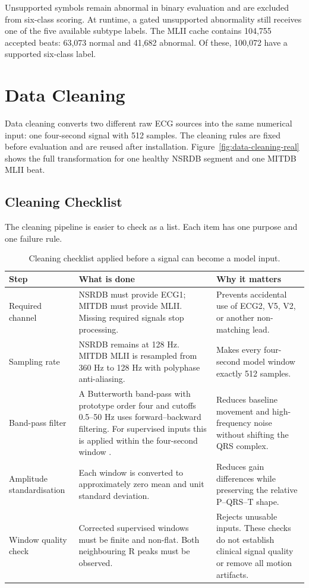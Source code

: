 Unsupported symbols remain abnormal in binary evaluation and are excluded
from six-class scoring. At runtime, a gated unsupported abnormality still
receives one of the five available subtype labels. The MLII cache contains 104,755 accepted beats: 63,073
normal and 41,682 abnormal. Of these, 100,072 have a supported six-class label.

\section{Data Cleaning}

Data cleaning converts two different raw ECG sources into the same numerical
input: one four-second signal with 512 samples. The cleaning rules are fixed
before evaluation and are reused after installation.
Figure~\ref{fig:data-cleaning-real} shows the full transformation for one
healthy NSRDB segment and one MITDB MLII beat.

\subsection{Cleaning Checklist}

The cleaning pipeline is easier to check as a list. Each item has one purpose
and one failure rule.

\begin{table}[H]
\centering
\small
\caption{Cleaning checklist applied before a signal can become a model input.}
\label{tab:data-cleaning-checklist}
\begin{tabular}{>{\raggedright\arraybackslash}p{2.6cm}>{\raggedright\arraybackslash}p{5.0cm}>{\raggedright\arraybackslash}p{4.3cm}}
\toprule
Step & What is done & Why it matters\\
\midrule
Required channel & NSRDB must provide ECG1; MITDB must provide MLII. Missing
required signals stop processing. & Prevents accidental use of ECG2, V5, V2, or
another non-matching lead.\\
\addlinespace
Sampling rate & NSRDB remains at 128 Hz. MITDB MLII is resampled from 360 Hz to
128 Hz with polyphase anti-aliasing. & Makes every four-second model window
exactly 512 samples.\\
\addlinespace
Band-pass filter & A Butterworth band-pass with prototype order four
and cutoffs 0.5--50 Hz uses forward--backward filtering. For supervised inputs
this is applied within the four-second window \cite{butterworth1930filter,virtanen2020scipy}. & Reduces baseline
movement and high-frequency noise without shifting the QRS complex.\\
\addlinespace
Amplitude standardisation & Each window is converted to approximately zero mean
and unit standard deviation. & Reduces gain differences while preserving the
relative P--QRS--T shape.\\
\addlinespace
Window quality check & Corrected supervised windows must be finite and
non-flat. Both neighbouring R peaks must be observed. & Rejects unusable
inputs. These checks do not establish clinical signal quality or remove all
motion artifacts.\\
\bottomrule
\end{tabular}
\end{table}

